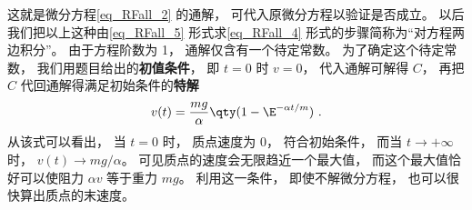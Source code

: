 这就是微分方程\autoref{eq_RFall_2} 的通解， 可代入原微分方程以验证是否成立。 以后我们把以上这种由\autoref{eq_RFall_5} 形式求\autoref{eq_RFall_4} 形式的步骤简称为“对方程两边积分”。 由于方程阶数为 1， 通解仅含有一个待定常数。 为了确定这个待定常数， 我们用题目给出的\textbf{初值条件}， 即 $t = 0$ 时 $v = 0$， 代入通解可解得 $C$， 再把 $C$ 代回通解得满足初始条件的\textbf{特解}
\begin{equation}
v(t) = \frac{mg}{\alpha} \qty( 1- \E^{-\alpha t/m} )~.
\end{equation}
从该式可以看出， 当 $t = 0$ 时， 质点速度为 0， 符合初始条件， 而当 $t\to +\infty$ 时， $ v(t) \to mg/\alpha$。 可见质点的速度会无限趋近一个最大值， 而这个最大值恰好可以使阻力 $\alpha v$ 等于重力 $mg$。 利用这一条件， 即使不解微分方程， 也可以很快算出质点的末速度。

